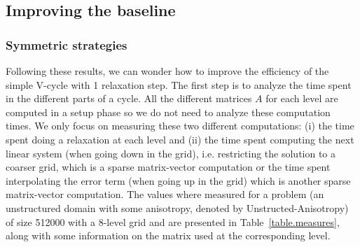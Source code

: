\subsection{Improving the baseline}

\subsubsection{Symmetric strategies}
Following these results, we can wonder how to improve the efficiency of the simple V-cycle with 1 relaxation step.
The first step is to analyze the time spent in the different parts of a cycle. All the different matrices $A$ for each level are computed in a setup phase so we do not need to analyze these computation times. We only focus on measuring these two different computations: (i) the time spent doing a relaxation at each level and (ii) the time spent computing the next linear system
(when going down in the grid), i.e. restricting the solution to a coarser grid, which is a sparse matrix-vector computation or the time spent interpolating the error term (when going up in the grid) which is another sparse matrix-vector computation. The values where measured for a problem (an unstructured domain with some anisotropy, denoted by Unstructed-Anisotropy) of size 512000 with a 8-level grid and are presented
in Table~\ref{table.measures}, along with some information on the matrix used at the corresponding level.

